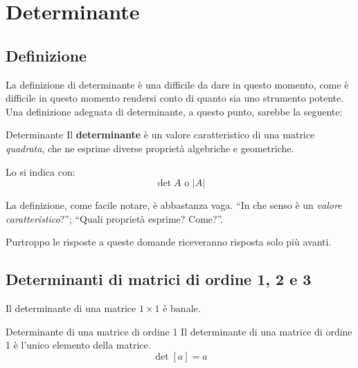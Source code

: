 \chapter{Determinante}
\section{Definizione}
La definizione di determinante è una difficile da dare in questo momento, come è difficile in questo momento rendersi conto di quanto sia uno strumento potente. Una definizione adeguata di determinante, a questo punto, sarebbe la seguente:
\begin{newdef}{Determinante}
    Il \textbf{determinante} è un valore caratteristico di una matrice \textit{quadrata}, che ne esprime diverse proprietà algebriche e geometriche.

    Lo si indica con:
    \[
        \det A \text{ o } |A|
    \]
\end{newdef}
La definizione, come facile notare, è abbastanza vaga. ``In che senso è un \textit{valore caratteristico}?''; ``Quali proprietà esprime? Come?''.

Purtroppo le risposte a queste domande riceveranno risposta solo più avanti.

\section{Determinanti di matrici di ordine 1, 2 e 3}
Il determinante di una matrice $1 \times 1$ è banale.

\begin{teo}{Determinante di una matrice di ordine 1}
    Il determinante di una matrice di ordine 1 è l'unico elemento della matrice.
    \[
        \det[a] = a
    \]
\end{teo}

